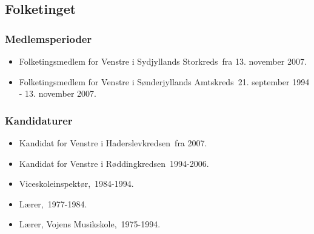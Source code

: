 \documentclass[11pt, a4paper]{awesome-cv}
\begin{document}
\begin{cvletter}
\subsection*{Folketinget}
\subsubsection*{Medlemsperioder}
\begin{itemize}
\item Folketingsmedlem for Venstre i Sydjyllands Storkreds fra 13. november 2007.
\item Folketingsmedlem for Venstre i Sønderjyllands Amtskreds 21. september 1994 - 13. november 2007.
\end{itemize}
\subsubsection*{Kandidaturer}
\begin{itemize}
\item Kandidat for Venstre i Haderslevkredsen fra 2007.
\item Kandidat for Venstre i Røddingkredsen 1994-2006.
\end{itemize}
\begin{itemize}
\item Viceskoleinspektør, 1984-1994.
\item Lærer, 1977-1984.
\item Lærer, Vojens Musikskole, 1975-1994.
\end{itemize}
\end{cvletter}
\end{document}
